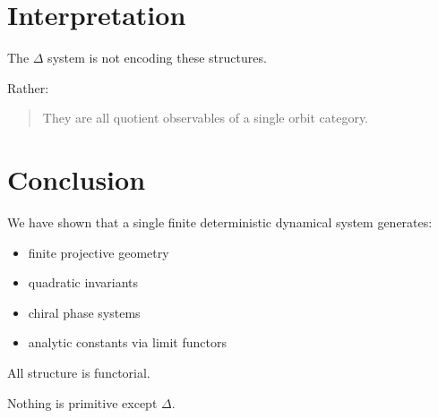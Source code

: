 \documentclass[11pt]{article}
\begin{document}
\section{Interpretation}

The $\Delta$ system is not encoding these structures.

Rather:

\begin{quote}
They are all quotient observables of a single orbit category.
\end{quote}

\section{Conclusion}

We have shown that a single finite deterministic dynamical system generates:

\begin{itemize}
\item finite projective geometry
\item quadratic invariants
\item chiral phase systems
\item analytic constants via limit functors
\end{itemize}

All structure is functorial.

Nothing is primitive except $\Delta$.
\end{document}
